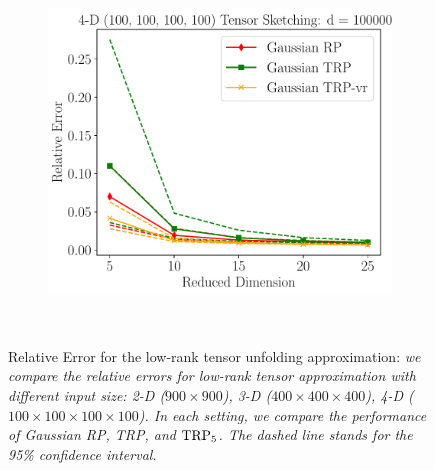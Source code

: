 \begin{figure}[ht!]
\begin{subfigure}{0.32\textwidth}
		\includegraphics[scale = 0.3]{figure/col_dim4_krao_d1000000.pdf}
	\end{subfigure}\\
	\caption{Relative Error for the low-rank tensor unfolding approximation: \textit{we compare the relative errors for low-rank tensor approximation with different input size: 2-D ($900 \times 900$), 3-D ($400 \times 400 \times 400$), 4-D ($100 \times 100 \times 100 \times 100$). In each setting, we compare the performance of Gaussian RP, TRP, and $\textup{TRP}_5$. The dashed line stands for the 95\% confidence interval.}}
	\label{fig:col_matrix}
\end{figure}

